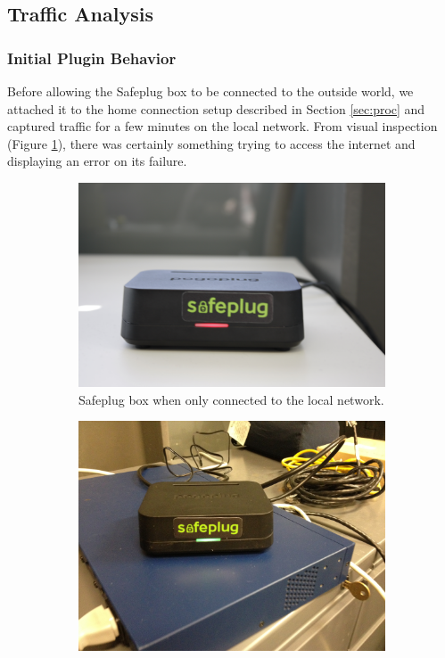 \subsection{Traffic Analysis}
\label{sec:traffic}

\subsubsection{Initial Plugin Behavior}
Before allowing the Safeplug box to be connected to the outside world, we attached it to the home connection setup described in Section \ref{sec:proc} and captured traffic for a few minutes on the local network.  From visual inspection (Figure \ref{redlight}), there was certainly something trying to access the internet and displaying an error on its failure.  

\begin{figure}[htb]
        \centering
        \begin{subfigure}[b]{0.3\textwidth}
                \includegraphics[width=\textwidth]{redlight.jpg}
                \caption{Safeplug box when only connected to the local network.}
                \label{redlight}
        \end{subfigure}%
        \quad %
        \begin{subfigure}[b]{0.4\textwidth}
          \centering
          \includegraphics[width=.66\textwidth,angle=180]{greenlight.jpg}

\end{subfigure}
\end{figure}
